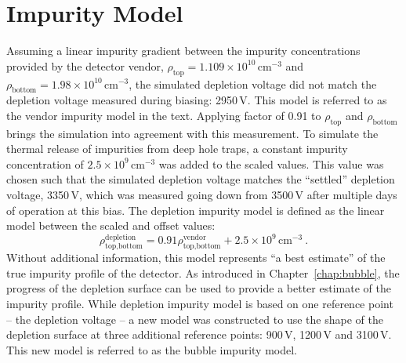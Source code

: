 \section{Impurity Model}
Assuming a linear impurity gradient between the impurity concentrations provided by the detector vendor, $\rho_{\text{top}} = 1.109\times 10^{10}\,\text{cm}^{-3}$ and $\rho_{\text{bottom}} = 1.98\times 10^{10}\,\text{cm}^{-3}$, the simulated depletion voltage did not match the depletion voltage measured during biasing: 2950\,V. This model is referred to as the vendor impurity model in the text. Applying factor of 0.91 to $\rho_{\text{top}}$ and $\rho_{\text{bottom}}$ brings the simulation into agreement with this measurement. To simulate the thermal release of impurities from deep hole traps, a constant impurity concentration of $2.5\times10^9$\,cm$^{-3}$ was added to the scaled values. This value was chosen such that the simulated depletion voltage matches the ``settled'' depletion voltage, 3350\,V, which was measured going down from 3500\,V after multiple days of operation at this bias. The depletion impurity model is defined as the linear model between the scaled and offset values:
\begin{equation}
	\rho_\text{top,bottom}^\text{depletion} = 0.91\rho_\text{top,bottom}^\text{vendor} + 2.5\times10^9\,\text{cm}^{-3}~.
\end{equation}
Without additional information, this model represents ``a best estimate'' of the true impurity profile of the detector. As introduced in Chapter~\ref{chap:bubble}, the progress of the depletion surface can be used to provide a better estimate of the impurity profile. While depletion impurity model is based on one reference point -- the depletion voltage -- a new model was constructed to use the shape of the depletion surface at three additional reference points: 900\,V, 1200\,V and 3100\,V. This new model is referred to as the bubble impurity model. 
